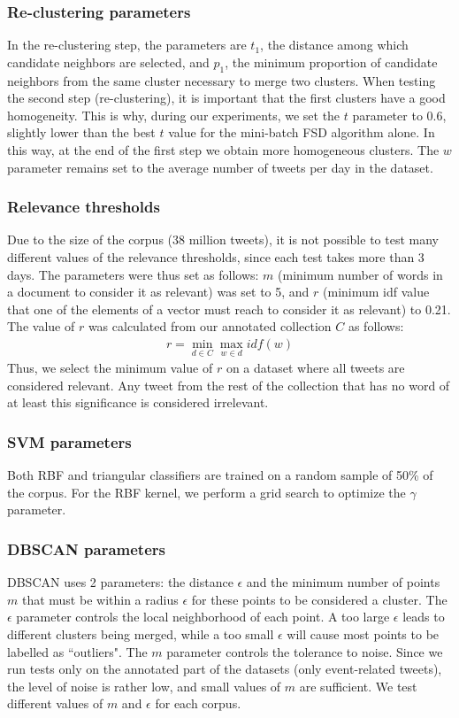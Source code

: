 \subsubsection{Re-clustering parameters}
In the re-clustering step, the parameters are $t_1$, the distance among which candidate neighbors are selected, and $p_1$, the minimum proportion of candidate neighbors from the same cluster necessary to merge two clusters.
When testing the second step (re-clustering), it is important that the first clusters have a good homogeneity. This is why, during our experiments, we set the $t$ parameter to 0.6, slightly lower than the best $t$ value for the mini-batch FSD algorithm alone. In this way, at the end of the first step we obtain more homogeneous clusters. The $w$ parameter remains set to the average number of tweets per day in the dataset.

\subsubsection{Relevance thresholds}
Due to the size of the corpus (38 million tweets), it is not possible to test many different values of the relevance thresholds, since each test takes more than 3 days. The parameters were thus set as follows: $m$ (minimum number of words in a document to consider it as relevant) was set to 5, and $r$ (minimum idf value that one of the elements of a vector must reach to consider it as relevant) to 0.21. The value of $r$ was calculated from our annotated collection $C$ as follows: 
\begin{align*}
r = \min_{d \in C}\max_{w \in d}idf(w)
\end{align*}
Thus, we select the minimum value of $r$ on a dataset where all tweets are considered relevant. Any tweet from the rest of the collection that has no word of at least this significance is considered irrelevant.

\subsubsection{SVM parameters}
Both RBF and triangular classifiers are trained on a random sample of 50\% of the corpus. For the RBF kernel, we perform a grid search to optimize the $\gamma$ parameter. 

\subsubsection{DBSCAN parameters}
DBSCAN uses 2 parameters: the distance $\epsilon$ and the minimum number of points $m$ that must be within a radius $\epsilon$ for these points to be considered a cluster. The $\epsilon$ parameter controls the local neighborhood of each point. A too large $\epsilon$ leads to different clusters being merged, while a too small $\epsilon$ will cause most points to be labelled as ``outliers". The $m$ parameter controls the tolerance to noise. Since we run tests only on the annotated part of the datasets (only event-related tweets), the level of noise is rather low, and small values of $m$ are sufficient. We test different values of $m$ and $\epsilon$ for each corpus.

